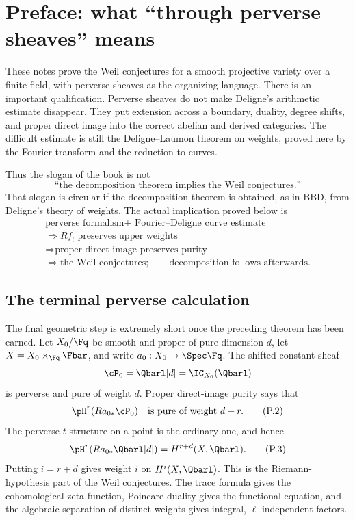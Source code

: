 \chapter*{Preface: what “through perverse sheaves” means}

These notes prove the Weil conjectures for a smooth projective variety over a
finite field, with perverse sheaves as the organizing language.  There is an
important qualification.  Perverse sheaves do not make Deligne's arithmetic
estimate disappear.  They put extension across a boundary, duality, degree
shifts, and proper direct image into the correct abelian and derived
categories.  The difficult estimate is still the Deligne--Laumon theorem on
weights, proved here by the Fourier transform and the reduction to curves.

Thus the slogan of the book is not
\[
  \text{“the decomposition theorem implies the Weil conjectures.”}
\]
That slogan is circular if the decomposition theorem is obtained, as in BBD,
from Deligne's theory of weights.  The actual implication proved below is
\[
\boxed{
\begin{gathered}
 \text{perverse formalism}
 +\text{ Fourier--Deligne curve estimate}\\
 \Longrightarrow Rf_!\text{ preserves upper weights}\\
 \Longrightarrow \text{proper direct image preserves purity}\\
 \Longrightarrow \text{the Weil conjectures};\qquad
 \text{decomposition follows afterwards.}
\end{gathered}}
\tag{P.1}\label{eq:preface-route}
\]

\section*{The terminal perverse calculation}

The final geometric step is extremely short once the preceding theorem has
been earned.  Let \(X_0/\Fq\) be smooth and proper of pure dimension \(d\), let
\(X=X_0\times_{\Fq}\Fbar\), and write
\(a_0:X_0\to\Spec\Fq\).  The shifted constant sheaf
\[
  \cP_0=\Qbarl[d]=\IC_{X_0}(\Qbarl)
\]
is perverse and pure of weight \(d\).  Proper direct-image purity says that
\[
  \pH^r(Ra_{0*}\cP_0)
  \quad\text{is pure of weight }d+r.
\tag{P.2}\label{eq:preface-proper-purity}
\]
The perverse \(t\)-structure on a point is the ordinary one, and hence
\[
  \pH^r(Ra_{0*}\Qbarl[d])
  =H^{r+d}(X,\Qbarl).
\tag{P.3}\label{eq:preface-point}
\]
Putting \(i=r+d\) gives weight \(i\) on \(H^i(X,\Qbarl)\).  This is the
Riemann-hypothesis part of the Weil conjectures.  The trace formula gives the
cohomological zeta function, Poincare duality gives the functional equation,
and the algebraic separation of distinct weights gives integral,
\(\ell\)-independent factors.

